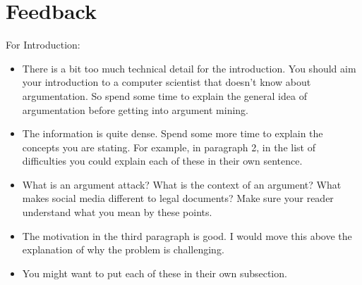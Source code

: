 \section{Feedback}
For Introduction:
\begin{itemize}
    \item There is a bit too much technical detail for the introduction. You should aim your introduction to a computer scientist that doesn't know about argumentation. So spend some time to explain the general idea of argumentation before getting into argument mining.

    \item The information is quite dense. Spend some more time to explain the concepts you are stating. For example, in paragraph 2, in the list of difficulties you could explain each of these in their own sentence.

    \item What is an argument attack? What is the context of an argument? What makes social media different to legal documents? Make sure your reader understand what you mean by these points.

    \item The motivation in the third paragraph is good. I would move this above the explanation of why the problem is challenging. 

    \item You might want to put each of these in their own subsection.
\end{itemize}